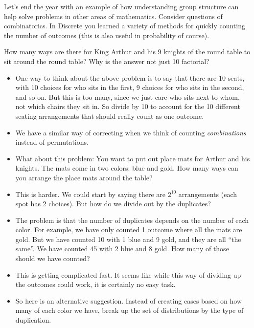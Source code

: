 \documentclass[12pt]{article}
\theoremstyle{plain}
\theoremstyle{definition}
\theoremstyle{remark}
\newcommand{\ex}{\noindent{\bf Ex: }}
\begin{document}
Let's end the year with an example of how understanding group structure can help solve problems in other areas of mathematics.  Consider questions of combinatorics.  In Discrete you learned a variety of methods for quickly counting the number of outcomes (this is also useful in probability of course).  

\ex How many ways are there for King Arthur and his 9 knights of the round table to sit around the round table?  Why is the answer not just 10 factorial?  

\begin{itemize}




\item One way to think about the above problem is to say that there are 10 seats, with 10 choices for who sits in the first, 9 choices for who sits in the second, and so on.  But this is too many, since we just care who sits next to whom, not which chairs they sit in.  So divide by 10 to account for the 10 different seating arrangements that should really count as one outcome.

\item We have a similar way of correcting when we think of counting \emph{combinations} instead of permutations. 

\item What about this problem: You want to put out place mats for Arthur and his knights.  The mats come in two colors: blue and gold.  How many ways can you arrange the place mats around the table?

\item This is harder.  We could start by saying there are $2^{10}$ arrangements (each spot has 2 choices).  But how do we divide out by the duplicates?  

\item The problem is that the number of duplicates depends on the number of each color.  For example, we have only counted 1 outcome where all the mats are gold.  But we have counted 10 with 1 blue and 9 gold, and they are all ``the same''.  We have counted 45 with 2 blue and 8 gold.  How many of those should we have counted?

\item This is getting complicated fast.  It seems like while this way of dividing up the outcomes could work, it is certainly no easy task.

\item So here is an alternative suggestion.  Instead of creating cases based on how many of each color we have, break up the set of distributions by the type of duplication.


\end{itemize}
\end{document}

